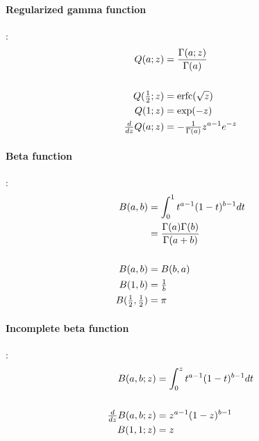 \paragraph*{Regularized gamma function}\hspace{-0.8em}\cite{Abramowitz1965}:%
 \begin{align*} 
Q(a;z)& = \frac{\Gamma(a;z) }{\Gamma(a)} 				
\\
\\
Q(\tfrac{1}{2}; z) &= \operatorname{erfc}(\sqrt{z})					
\\
Q(1;z) &= \exp(-z)									
\\
\tfrac{d}{dz} Q(a;z) &= -\tfrac{1}{\Gamma(a)} z^{a-1} e^{-z} 	
\end{align*}





\paragraph*{Beta function}\hspace{-0.8em}\cite{Abramowitz1965}:%
%
\begin{align*}
B(a,b) & 
= \int_0^1 t^{a-1}(1-t)^{b-1} dt						
\\ &= \frac{\Gamma(a)\Gamma(b)}{\Gamma(a+b)}		
\\
\\ B(a,b) & = B(b,a) 								
\\ B(1, b) &= \tfrac{1}{b}							
\\ B(\tfrac{1}{2}, \tfrac{1}{2}) &= \pi					
\end{align*}



\paragraph*{Incomplete beta function}\hspace{-0.8em}\cite{Abramowitz1965}:%
%
%
\begin{align*}
B(a,b;z) & = \int_0^z t^{a-1} (1-t)^{b-1} dt 							
\\
\\
\tfrac{d}{dz} B(a,b;z) & = z^{a-1} (1-z)^{b-1} 			 \\
B(1,1;z) & = z										
\end{align*}	




